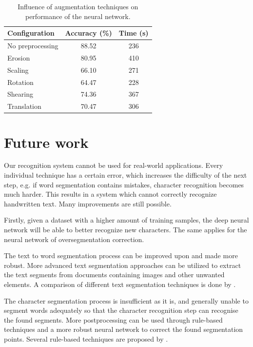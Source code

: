 \documentclass{article}
\begin{document}
\begin{table}
\caption{Influence of augmentation techniques on performance of the neural network.}
\label{tab:preprocess}
\vskip 0.15in
\begin{center}
\begin{small}
\begin{sc}
\begin{tabular}{lcc}
\hline
\abovespace\belowspace
Configuration & Accuracy (\%) & Time (s) \\
\hline
\abovespace
No preprocessing & 88.52 & 236 \\
Erosion & 80.95 & 410 \\
Scaling & 66.10 & 271 \\
Rotation & 64.47 & 228 \\
Shearing & 74.36 & 367 \\
Translation & 70.47 & 306 \\
\hline
\end{tabular}
\end{sc}
\end{small}
\end{center}
\vskip -0.1in
\end{table}


\section{Future work}
Our recognition system cannot be used for real-world applications. Every individual technique has a certain error, which increases the difficulty of the next step, e.g. if word segmentation contains mistakes, character recognition becomes much harder.
This results in a system which cannot correctly recognize handwritten text.
Many improvements are still possible.

Firstly, given a dataset with a higher amount of training samples, the deep neural network will be able to better recognize new characters. The same applies for the neural network of oversegmentation correction.

The text to word segmentation process can be improved upon and made more robust.
More advanced text segmentation approaches can be utilized to extract the text segments from documents containing images and other unwanted elements. A comparison of different text segmentation techniques is done by \cite{textsegm}.

The character segmentation process is insufficient as it is, and generally unable to segment words adequately so that the character recognition step can recognise the found segments.
More postprocessing can be used through rule-based techniques and a more robust neural network to correct the found segmentation points.
Several rule-based techniques are proposed by \cite{segmtechniques}.
\end{document}
